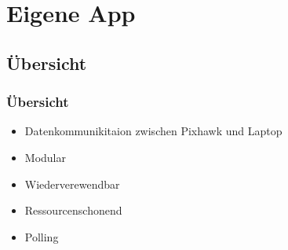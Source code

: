\section{Eigene App}
\subsection{\"Ubersicht}
\begin{frame}\frametitle{\"Ubersicht}

\begin{itemize}
\item Datenkommunikitaion zwischen Pixhawk und Laptop
\item Modular
\item Wiederverewendbar
\item Ressourcenschonend
\item Polling
\end{itemize}



\end{frame}


